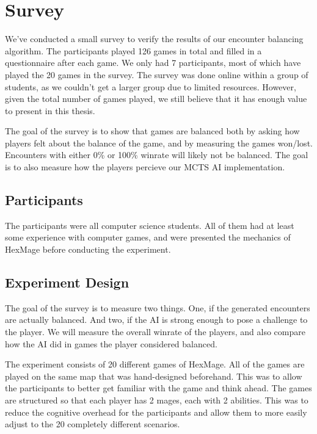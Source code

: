 \section{Survey}
\label{survey}

We've conducted a small survey to verify the results of our encounter balancing algorithm. The participants played 126 games in total and filled in a questionnaire after each game. We only had 7 participants, most of which have played the 20 games in the survey. The survey was done online within a group of students, as we couldn't get a larger group due to limited resources. However, given the total number of games played, we still believe that it has enough value to present in this thesis.

The goal of the survey is to show that games are balanced both by asking how players felt about the balance of the game, and by measuring the games won/lost. Encounters with either 0\% or 100\% winrate will likely not be balanced. The goal is to also measure how the players percieve our MCTS AI implementation.

\subsection{Participants}

The participants were all computer science students. All of them had at least
some experience with computer games, and were presented the mechanics of HexMage
before conducting the experiment.

\subsection{Experiment Design}

The goal of the survey is to measure two things. One, if the generated
encounters are actually balanced. And two, if the AI is strong enough to pose a
challenge to the player. We will measure the overall winrate of the players,
and also compare how the AI did in games the player considered balanced.

The experiment consists of 20 different games of HexMage. All of the games are
played on the same map that was hand-designed beforehand. This was to allow the
participants to better get familiar with the game and think ahead. The games
are structured so that each player has 2 mages, each with 2 abilities. This was
to reduce the cognitive overhead for the participants and allow them to more easily
adjust to the 20 completely different scenarios. 

